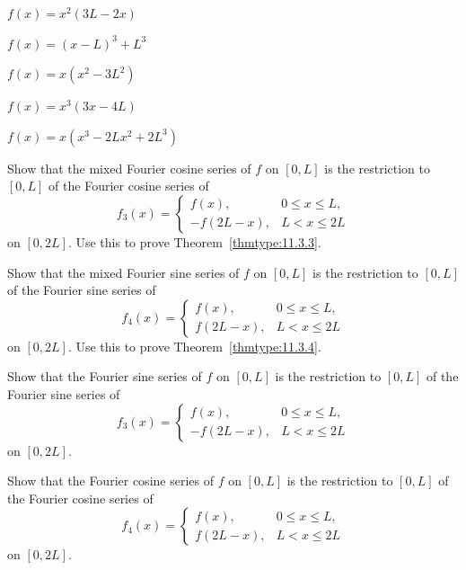 \begin{exerciselist}
  \item\label{exer:11.3.52} $f(x)=x^{2}(3L-2x)$

  \item\label{exer:11.3.53} $f(x)=(x-L)^{3}+L^{3}$

  \item\label{exer:11.3.54} $f(x)=x(x^{2}-3L^{2})$

  \item\label{exer:11.3.55} $f(x)=x^{3}(3x-4L)$

  \item\label{exer:11.3.56} $f(x)=x(x^{3}-2Lx^{2}+2L^{3})$

  \item\label{exer:11.3.57} Show that the mixed Fourier cosine series of $f$ on $[0,L]$ is the
        restriction to $[0,L]$ of the Fourier cosine series of
  \[
    f_{3}(x)= \left\{
    \begin{array}{cl}
      f(x),     & 0\le x\le L, \\
      -f(2L-x), & L<x\le2L
    \end{array}\right.
  \]
  on $[0,2L]$. Use this to prove Theorem~\ref{thmtype:11.3.3}.

  \item\label{exer:11.3.58} Show that the mixed Fourier sine series of $f$ on $[0,L]$ is the
        restriction to $[0,L]$ of the Fourier sine series of
  \[
    f_{4}(x)= \left\{
    \begin{array}{cl}
      f(x),    & 0\le x\le L, \\
      f(2L-x), & L<x\le2L
    \end{array}\right.
  \]
  on $[0,2L]$. Use this to prove Theorem~\ref{thmtype:11.3.4}.

  \item\label{exer:11.3.59} Show that the Fourier sine series of $f$ on $[0,L]$ is the restriction
        to $[0,L]$ of the Fourier sine series of
  \[
    f_{3}(x)= \left\{
    \begin{array}{cl}
      f(x),     & 0\le x\le L, \\
      -f(2L-x), & L<x\le2L
    \end{array}\right.
  \]
  on $[0,2L]$.

  \item\label{exer:11.3.60} Show that the Fourier cosine series of $f$ on $[0,L]$ is the restriction
        to $[0,L]$ of the Fourier cosine series of
  \[
    f_{4}(x)= \left\{
    \begin{array}{cl}
      f(x),    & 0\le x\le L, \\
      f(2L-x), & L<x\le2L
    \end{array}\right.
  \]
  on $[0,2L]$.
\end{exerciselist}
